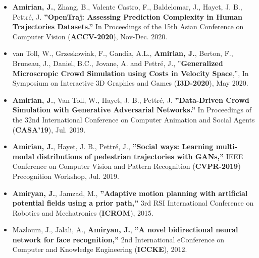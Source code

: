 \documentclass[10pt]{res}
\begin{document}
\begin{resume}
\begin{itemize}
\item {\bf Amirian, J.}, Zhang, B., Valente Castro, F., Baldelomar, J., Hayet, J. B., Pettré, J. {\bf ''OpenTraj: Assessing Prediction Complexity in Human Trajectories Datasets.''} In Proceedings of the 15th Asian Conference on Computer Vision (\textbf{ACCV-2020}), Nov-Dec. 2020.

\item van Toll, W., Grzeskowiak, F., Gandía, A.L., \textbf{Amirian, J.}, Berton, F., Bruneau, J., Daniel, B.C., Jovane, A. and Pettré, J., ''\textbf{Generalized Microscropic Crowd Simulation using Costs in Velocity Space},'', In Symposium on Interactive 3D Graphics and Games (\textbf{I3D-2020}), May 2020.

\item {\bf Amirian, J.}, Van Toll, W., Hayet, J. B., Pettré, J. {\bf ''Data-Driven Crowd Simulation with Generative Adversarial Networks.''} In Proceedings of the 32nd International Conference on Computer Animation and Social Agents (\textbf{CASA'19}), Jul. 2019.

\item {\bf Amirian, J.}, Hayet, J. B., Pettré, J., {\bf ''Social ways: Learning multi-modal distributions of pedestrian trajectories with GANs,''} IEEE Conference on Computer Vision and Pattern Recognition (\textbf{CVPR-2019}) Precognition Workshop, Jul. 2019.


\item {\bf Amiryan, J.}, Jamzad, M., {\bf ''Adaptive motion planning with artificial potential fields using a prior path,''} 3rd RSI International Conference on Robotics and Mechatronics (\textbf{ICROM}), 2015.


\item Mazloum, J., Jalali, A., {\bf Amiryan, J.}, {\bf ''A novel bidirectional neural network for face recognition,''} 2nd International eConference on Computer and Knowledge Engineering (\textbf{ICCKE}), 2012.

\end{itemize}



\end{resume}
\end{document}

